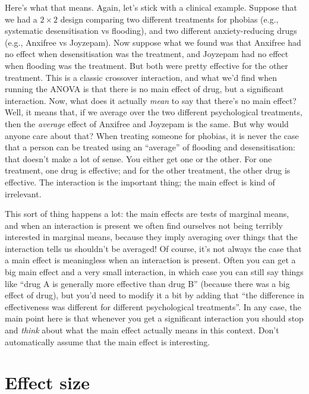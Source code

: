 \documentclass[
  11pt,
  a4paper,
  twoside,symmetric,openright]{book}
\theoremstyle{break}
\theoremstyle{break}
\begin{document}
Here's what that means. Again, let's stick with a clinical example. Suppose that we had a \(2 \times 2\) design comparing two different treatments for phobias (e.g., systematic desensitisation vs flooding), and two different anxiety-reducing drugs (e.g., Anxifree vs Joyzepam). Now suppose what we found was that Anxifree had no effect when desensitisation was the treatment, and Joyzepam had no effect when flooding was the treatment. But both were pretty effective for the other treatment. This is a classic crossover interaction, and what we'd find when running the ANOVA is that there is no main effect of drug, but a significant interaction. Now, what does it actually \emph{mean} to say that there's no main effect? Well, it means that, if we average over the two different psychological treatments, then the \emph{average} effect of Anxifree and Joyzepam is the same. But why would anyone care about that? When treating someone for phobias, it is never the case that a person can be treated using an ``average'' of flooding and desensitisation: that doesn't make a lot of sense. You either get one or the other. For one treatment, one drug is effective; and for the other treatment, the other drug is effective. The interaction is the important thing; the main effect is kind of irrelevant.

This sort of thing happens a lot: the main effects are tests of marginal means, and when an interaction is present we often find ourselves not being terribly interested in marginal means, because they imply averaging over things that the interaction tells us shouldn't be averaged! Of course, it's not always the case that a main effect is meaningless when an interaction is present. Often you can get a big main effect and a very small interaction, in which case you can still say things like ``drug A is generally more effective than drug B'' (because there was a big effect of drug), but you'd need to modify it a bit by adding that ``the difference in effectiveness was different for different psychological treatments''. In any case, the main point here is that whenever you get a significant interaction you should stop and \emph{think} about what the main effect actually means in this context. Don't automatically assume that the main effect is interesting.

\section{Effect size}\label{effectsizefactorialanova}
\end{document}
